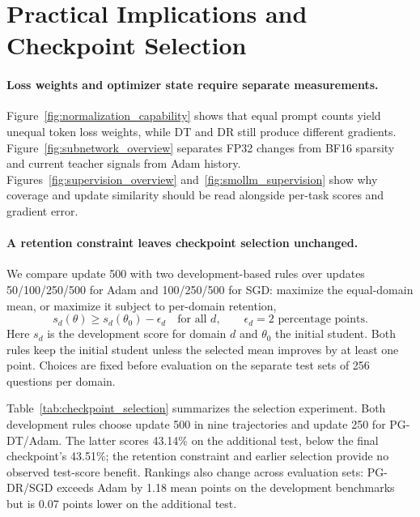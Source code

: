 \section{Practical Implications and Checkpoint Selection}
\label{sec:recipe}

\paragraph{Loss weights and optimizer state require separate measurements.}
Figure~\ref{fig:normalization_capability} shows that equal prompt counts yield unequal token loss weights, while DT and DR still produce different gradients. Figure~\ref{fig:subnetwork_overview} separates FP32 changes from BF16 sparsity and current teacher signals from Adam history. Figures~\ref{fig:supervision_overview} and~\ref{fig:smollm_supervision} show why coverage and update similarity should be read alongside per-task scores and gradient error.

\paragraph{A retention constraint leaves checkpoint selection unchanged.}
We compare update 500 with two development-based rules over updates 50/100/250/500 for Adam and 100/250/500 for SGD: maximize the equal-domain mean, or maximize it subject to per-domain retention,
\begin{equation}
s_d(\theta)\geq s_d(\theta_0)-\epsilon_d\quad\text{for all }d,
\qquad \epsilon_d=2\text{ percentage points}.
\label{eq:retention}
\end{equation}
Here $s_d$ is the development score for domain $d$ and $\theta_0$ the initial student. Both rules keep the initial student unless the selected mean improves by at least one point. Choices are fixed before evaluation on the separate test sets of 256 questions per domain.

Table~\ref{tab:checkpoint_selection} summarizes the selection experiment. Both development rules choose update 500 in nine trajectories and update 250 for PG-DT/Adam. The latter scores 43.14\% on the additional test, below the final checkpoint's 43.51\%; the retention constraint and earlier selection provide no observed test-score benefit. Rankings also change across evaluation sets: PG-DR/SGD exceeds Adam by 1.18 mean points on the development benchmarks but is 0.07 points lower on the additional test.


